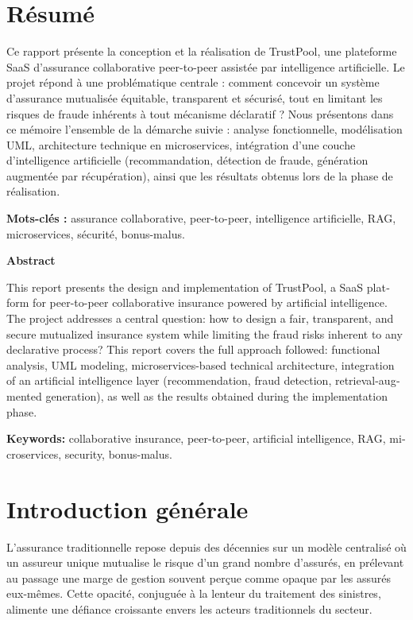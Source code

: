\documentclass[12pt,a4paper]{report}
\begin{document}
\chapter*{Résumé}
\thispagestyle{empty}
Ce rapport présente la conception et la réalisation de TrustPool, une plateforme SaaS d'assurance collaborative peer-to-peer assistée par intelligence artificielle. Le projet répond à une problématique centrale : comment concevoir un système d'assurance mutualisée équitable, transparent et sécurisé, tout en limitant les risques de fraude inhérents à tout mécanisme déclaratif ? Nous présentons dans ce mémoire l'ensemble de la démarche suivie : analyse fonctionnelle, modélisation UML, architecture technique en microservices, intégration d'une couche d'intelligence artificielle (recommandation, détection de fraude, génération augmentée par récupération), ainsi que les résultats obtenus lors de la phase de réalisation.

\textbf{Mots-clés :} assurance collaborative, peer-to-peer, intelligence artificielle, RAG, microservices, sécurité, bonus-malus.

\vspace{1cm}
\begin{otherlanguage}{english}
\textbf{Abstract}

This report presents the design and implementation of TrustPool, a SaaS platform for peer-to-peer collaborative insurance powered by artificial intelligence. The project addresses a central question: how to design a fair, transparent, and secure mutualized insurance system while limiting the fraud risks inherent to any declarative process? This report covers the full approach followed: functional analysis, UML modeling, microservices-based technical architecture, integration of an artificial intelligence layer (recommendation, fraud detection, retrieval-augmented generation), as well as the results obtained during the implementation phase.

\textbf{Keywords:} collaborative insurance, peer-to-peer, artificial intelligence, RAG, microservices, security, bonus-malus.
\end{otherlanguage}
\newpage

\chapter*{Introduction générale}
L'assurance traditionnelle repose depuis des décennies sur un modèle centralisé où un assureur unique mutualise le risque d'un grand nombre d'assurés, en prélevant au passage une marge de gestion souvent perçue comme opaque par les assurés eux-mêmes. Cette opacité, conjuguée à la lenteur du traitement des sinistres, alimente une défiance croissante envers les acteurs traditionnels du secteur.
\end{document}
